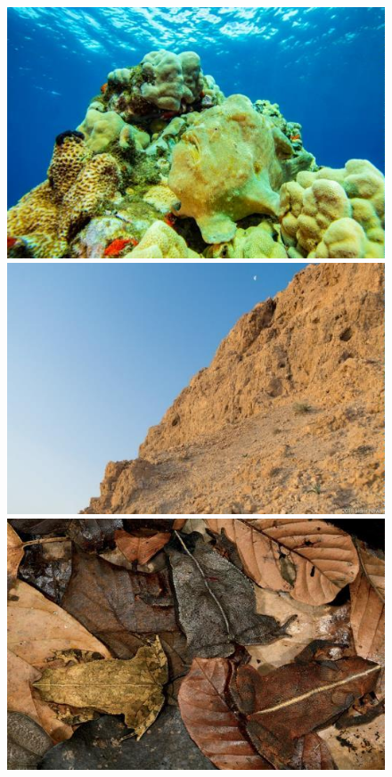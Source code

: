 \documentclass[final]{cvpr}
\begin{document}
\begin{figure}[tp]
{\begin{minipage}[htbp]{.18\linewidth}
        \includegraphics[scale=0.25]{COD_Zh_translate/figures/example3.png}
        \hspace{5mm} %
    \end{minipage}
}
\subfigure
{
 	\begin{minipage}[htbp]{.18\linewidth}
        \centering
        \includegraphics[scale=0.25]{COD_Zh_translate/figures/example4.png}
        \hspace{5mm} %
    \end{minipage}
}
\subfigure
{
 	\begin{minipage}[htbp]{.18\linewidth}
        \centering
        \includegraphics[scale=0.25]{COD_Zh_translate/figures/example5.png}

\end{minipage}}
\end{figure}
\end{document}
